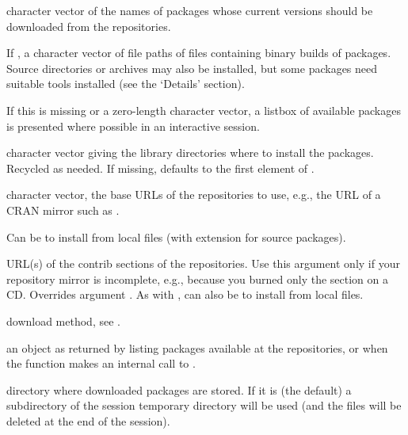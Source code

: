 %
\begin{Arguments}
\begin{ldescription}
\item[\code{pkgs}] character vector of the names of packages whose
current versions should be downloaded from the repositories.

If , a character vector of file paths of
 files containing binary builds of packages. Source
directories or  archives may also be installed, but
some packages need suitable tools installed (see the
`Details' section).

If this is missing or a zero-length character vector, a listbox of
available packages is presented where possible in an interactive \R{}
session.

\item[\code{lib}] 
character vector giving the library directories where to
install the packages.  Recycled as needed.  If missing, defaults to
the first element of .

\item[\code{repos}] 
character vector, the base URLs of the repositories
to use, e.g., the URL of a CRAN mirror such as
.

Can be  to install from local files
(with extension  for source packages).

\item[\code{contriburl}] 
URL(s) of the contrib sections of the repositories.  Use this
argument only if your repository mirror is incomplete, e.g., because
you burned only the  section on a CD.  Overrides
argument .  As with , can also be 
to install from local files.

\item[\code{method}] 
download method, see .

\item[\code{available}] 
an object as returned by 
listing packages available at the repositories, or  when
the function makes an internal call to .

\item[\code{destdir}] 
directory where downloaded packages are stored.  If it is
 (the default) a subdirectory
 of the session temporary
directory will be used (and the files will be deleted
at the end of the session). 


\end{ldescription}
\end{Arguments}
